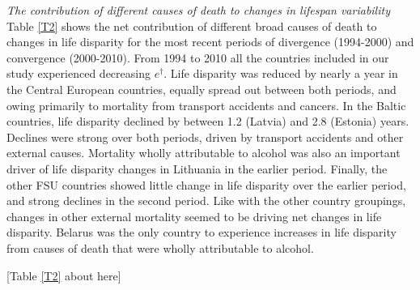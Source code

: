\documentclass{article}
\begin{document}
\begin{spacing}{1.5}
\textcolor[rgb]{0,0.58,0}{\emph{The contribution of different causes of death to changes in lifespan variability}}\\

\textcolor[rgb]{0,0.58,0}{Table \ref{T2} shows the net contribution of \textcolor[rgb]{0,0.58,0}{different broad causes of death} to changes in life disparity for the most recent periods of divergence (1994-2000) and convergence (2000-2010). From 1994 to 2010 all the countries included in our study experienced decreasing $e^\dagger$. Life disparity was reduced by nearly a year in the Central European countries, equally spread out between both periods, and owing primarily to mortality from transport accidents and cancers. In the Baltic countries, life disparity declined by between 1.2 (Latvia) and 2.8 (Estonia) years. Declines were strong over both periods, driven by transport accidents and other external causes. Mortality wholly attributable to alcohol was also an important driver of life disparity changes in Lithuania in the earlier period. Finally, the other FSU countries showed little change in life disparity over the earlier period, and strong declines in the second period. Like with the other country groupings, changes in other external mortality seemed to be driving net changes in life disparity. Belarus was the only country to experience increases in life disparity from causes of death that were wholly attributable to alcohol. \\
}

\begin{center}
[Table  \ref{T2} about here]\\
\end{center}



\end{spacing}
\end{document}
